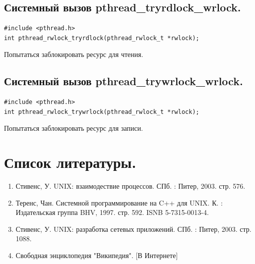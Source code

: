\documentclass[a4paper]{article}
\begin{document}
\subsection{\Large Системный вызов pthread\_tryrdlock\_wrlock.}
\begin{verbatim}
#include <pthread.h>
int pthread_rwlock_tryrdlock(pthread_rwlock_t *rwlock);
\end{verbatim}
Попытаться заблокировать ресурс для чтения.

\subsection{\Large Системный вызов pthread\_trywrlock\_wrlock.}
\begin{verbatim}
#include <pthread.h>
int pthread_rwlock_trywrlock(pthread_rwlock_t *rwlock);
\end{verbatim}
Попытаться заблокировать ресурс для записи.

\newpage
\section{\bf Список литературы.}
\begin{enumerate}
  \item Стивенс, У. UNIX: взаимодествие процессов. СПб. : Питер, 2003. стр. 576.
  \item Теренс, Чан. Системной программирование на C++ для UNIX. К. : Издательская группа BHV, 1997. стр. 592. ISNB 5-7315-0013-4.
  \item Стивенс, У. UNIX: разработка сетевых приложений. СПб. : Питер, 2003. стр. 1088.
  \item Свободная энциклопедия "Википедия". [В Интернете]
\end{enumerate}
\end{document}
